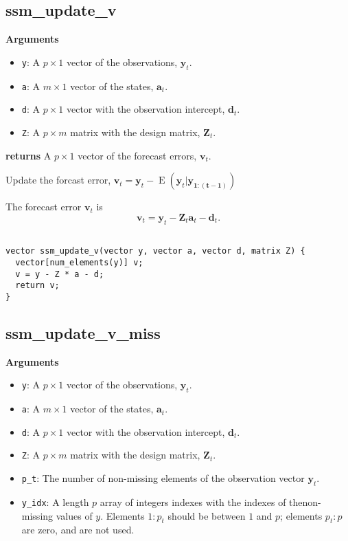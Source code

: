 \documentclass[]{book}
\providecommand{\tightlist}{%
  \setlength{\itemsep}{0pt}\setlength{\parskip}{0pt}}
\DeclareMathOperator{\E}{E}
\newcommand{\mat}[1]{\boldsymbol{#1}}
\renewcommand{\vec}[1]{\boldsymbol{#1}}
\begin{document}
\subsection{ssm\_update\_v}\label{ssm_update_v}

\textbf{Arguments}

\begin{itemize}
\tightlist
\item
  \texttt{y}: A \(p \times 1\) vector of the observations,
  \(\vec{y}_t\).
\item
  \texttt{a}: A \(m \times 1\) vector of the states, \(\vec{a}_t\).
\item
  \texttt{d}: A \(p \times 1\) vector with the observation intercept,
  \(\vec{d}_t\).
\item
  \texttt{Z}: A \(p \times m\) matrix with the design matrix,
  \(\mat{Z}_t\).
\end{itemize}

\textbf{returns} A \(p \times 1\) vector of the forecast errors,
\(\vec{v}_t\).

Update the forcast error,
\(\vec{v}_t = \vec{y}_t - \E(\vec{y}_t | \vec{y_{1:(t - 1)}})\)

The forecast error \(\vec{v}_t\) is \[
\vec{v}_t =\vec{y}_t - \mat{Z}_t \vec{a}_t - \vec{d}_t .
\]

\begin{verbatim}

vector ssm_update_v(vector y, vector a, vector d, matrix Z) {
  vector[num_elements(y)] v;
  v = y - Z * a - d;
  return v;
}

\end{verbatim}

\subsection{ssm\_update\_v\_miss}\label{ssm_update_v_miss}

\textbf{Arguments}

\begin{itemize}
\tightlist
\item
  \texttt{y}: A \(p \times 1\) vector of the observations,
  \(\vec{y}_t\).
\item
  \texttt{a}: A \(m \times 1\) vector of the states, \(\vec{a}_t\).
\item
  \texttt{d}: A \(p \times 1\) vector with the observation intercept,
  \(\vec{d}_t\).
\item
  \texttt{Z}: A \(p \times m\) matrix with the design matrix,
  \(\mat{Z}_t\).
\item
  \texttt{p\_t}: The number of non-missing elements of the observation
  vector \(\vec{y}_t\).
\item
  \texttt{y\_idx}: A length \(p\) array of integers indexes with the
  indexes of thenon-missing values of \(y\). Elements \(1:p_t\) should
  be between \(1\) and \(p\); elements \(p_t:p\) are zero, and are not
  used.
\end{itemize}
\end{document}

